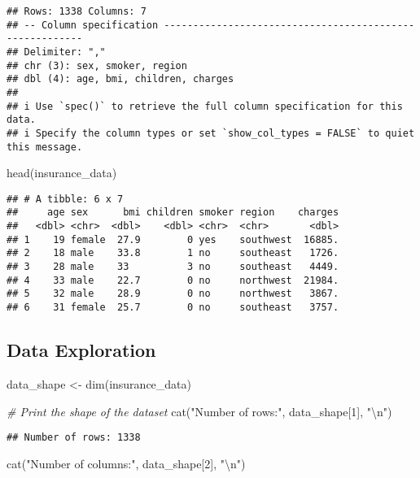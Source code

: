 \documentclass[
]{article}
\newenvironment{Shaded}{\begin{snugshade}}{\end{snugshade}}
\newcommand{\CommentTok}[1]{\textcolor[rgb]{0.56,0.35,0.01}{\textit{#1}}}
\newcommand{\DecValTok}[1]{\textcolor[rgb]{0.00,0.00,0.81}{#1}}
\newcommand{\FunctionTok}[1]{\textcolor[rgb]{0.00,0.00,0.00}{#1}}
\newcommand{\NormalTok}[1]{#1}
\newcommand{\OtherTok}[1]{\textcolor[rgb]{0.56,0.35,0.01}{#1}}
\newcommand{\SpecialCharTok}[1]{\textcolor[rgb]{0.00,0.00,0.00}{#1}}
\newcommand{\StringTok}[1]{\textcolor[rgb]{0.31,0.60,0.02}{#1}}
\begin{document}
\begin{verbatim}
## Rows: 1338 Columns: 7
## -- Column specification --------------------------------------------------------
## Delimiter: ","
## chr (3): sex, smoker, region
## dbl (4): age, bmi, children, charges
## 
## i Use `spec()` to retrieve the full column specification for this data.
## i Specify the column types or set `show_col_types = FALSE` to quiet this message.
\end{verbatim}

\begin{Shaded}
\begin{Highlighting}[]
\FunctionTok{head}\NormalTok{(insurance\_data)}
\end{Highlighting}
\end{Shaded}

\begin{verbatim}
## # A tibble: 6 x 7
##     age sex      bmi children smoker region    charges
##   <dbl> <chr>  <dbl>    <dbl> <chr>  <chr>       <dbl>
## 1    19 female  27.9        0 yes    southwest  16885.
## 2    18 male    33.8        1 no     southeast   1726.
## 3    28 male    33          3 no     southeast   4449.
## 4    33 male    22.7        0 no     northwest  21984.
## 5    32 male    28.9        0 no     northwest   3867.
## 6    31 female  25.7        0 no     southeast   3757.
\end{verbatim}

\hypertarget{data-exploration}{%
\subsection{Data Exploration}\label{data-exploration}}

\begin{Shaded}
\begin{Highlighting}[]
\NormalTok{data\_shape }\OtherTok{\textless{}{-}} \FunctionTok{dim}\NormalTok{(insurance\_data)}

\CommentTok{\# Print the shape of the dataset}
\FunctionTok{cat}\NormalTok{(}\StringTok{"Number of rows:"}\NormalTok{, data\_shape[}\DecValTok{1}\NormalTok{], }\StringTok{"}\SpecialCharTok{\textbackslash{}n}\StringTok{"}\NormalTok{)}
\end{Highlighting}
\end{Shaded}

\begin{verbatim}
## Number of rows: 1338
\end{verbatim}

\begin{Shaded}
\begin{Highlighting}[]
\FunctionTok{cat}\NormalTok{(}\StringTok{"Number of columns:"}\NormalTok{, data\_shape[}\DecValTok{2}\NormalTok{], }\StringTok{"}\SpecialCharTok{\textbackslash{}n}\StringTok{"}\NormalTok{) }
\end{Highlighting}
\end{Shaded}
\end{document}
